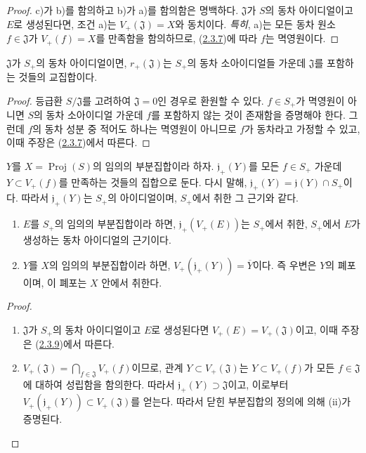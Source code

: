 \begin{proof}
c)가 b)를 함의하고 b)가 a)를 함의함은 명백하다. $\mathfrak{J}$가
$S$의 동차 아이디얼이고 $E$로 생성된다면, 조건 a)는
$V_+(\mathfrak{J})=X$와 동치이다. \emph{특히}, a)는 모든 동차 원소
$f\in\mathfrak{J}$가 $V_+(f)=X$를 만족함을
함의하므로, (\hyperref[II.2.3.7-ko]{2.3.7})에 따라 $f$는 멱영원이다.
\end{proof}

\begin{corollary}[2.3.9]
\label{II.2.3.9-ko}
$\mathfrak{J}$가 $S_+$의 동차 아이디얼이면,
$r_+(\mathfrak{J})$는 $S_+$의 동차 소아이디얼들 가운데
$\mathfrak{J}$를 포함하는 것들의 교집합이다.
\end{corollary}

\begin{proof}
등급환 $S/\mathfrak{J}$를 고려하여 $\mathfrak{J}=0$인 경우로 환원할 수
있다. $f\in S_+$가 멱영원이 아니면 $S$의 동차 소아이디얼 가운데
$f$를 포함하지 않는 것이 존재함을 증명해야 한다. 그런데 $f$의 동차
성분 중 적어도 하나는 멱영원이 아니므로 $f$가 동차라고 가정할 수 있고,
이때 주장은 (\hyperref[II.2.3.7-ko]{2.3.7})에서 따른다.
\end{proof}

\begin{env}[2.3.10]
\label{II.2.3.10-ko}
$Y$를 $X=\operatorname{Proj}(S)$의 임의의 부분집합이라 하자.
$\mathfrak{j}_+(Y)$를 모든 $f\in S_+$ 가운데 $Y\subset V_+(f)$를
만족하는 것들의 집합으로 둔다. 다시 말해,
$\mathfrak{j}_+(Y)=\mathfrak{j}(Y)\cap S_+$이다. 따라서
$\mathfrak{j}_+(Y)$는 $S_+$의 아이디얼이며, $S_+$에서 취한 그 근기와
같다.
\end{env}

\begin{proposition}[2.3.11]
\label{II.2.3.11-ko}
\begin{enumerate}
  \item[\rm(i)] $E$를 $S_+$의 임의의 부분집합이라 하면,
    $\mathfrak{j}_+(V_+(E))$는 $S_+$에서 취한, $S_+$에서 $E$가 생성하는
    동차 아이디얼의 근기이다.
  \item[\rm(ii)] $Y$를 $X$의 임의의 부분집합이라 하면,
    $V_+(\mathfrak{j}_+(Y))=\overline{Y}$이다. 즉 우변은 $Y$의 폐포이며,
    이 폐포는 $X$ 안에서 취한다.
\end{enumerate}
\end{proposition}

\begin{proof}
\begin{enumerate}
  \item[\rm(i)] $\mathfrak{J}$가 $S_+$의 동차 아이디얼이고 $E$로
    생성된다면 $V_+(E)=V_+(\mathfrak{J})$이고, 이때 주장은
    (\hyperref[II.2.3.9-ko]{2.3.9})에서 따른다.
  \item[\rm(ii)] $V_+(\mathfrak{J})=\bigcap_{f\in\mathfrak{J}}V_+(f)$이므로,
    관계 $Y\subset V_+(\mathfrak{J})$는 $Y\subset V_+(f)$가 모든
    $f\in\mathfrak{J}$에 대하여 성립함을 함의한다. 따라서
    $\mathfrak{j}_+(Y)\supset\mathfrak{J}$이고, 이로부터
    $V_+(\mathfrak{j}_+(Y))\subset V_+(\mathfrak{J})$를 얻는다. 따라서
    닫힌 부분집합의 정의에 의해 (ii)가 증명된다.
\end{enumerate}
\end{proof}


